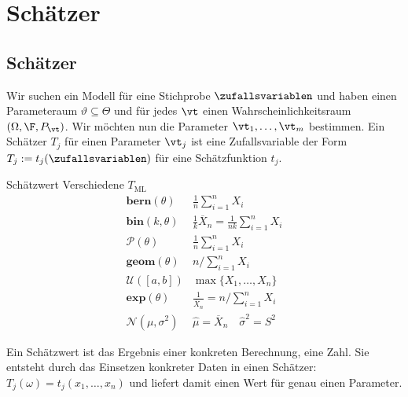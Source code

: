 
\section{Schätzer}
\subsection{Schätzer}
Wir suchen ein Modell für eine Stichprobe $\zufallsvariablen$ und haben einen
Parameteraum $\vartheta \subseteq \varTheta$ und für jedes $\vt$ einen
Wahrscheinlichkeitsraum $ (\Omega, \F, P_\vt)$. Wir möchten nun die Parameter
$\vt_1, \dots, \vt_m$ bestimmen. Ein Schätzer $T_j$ für einen Parameter $\vt_j$
ist eine Zufallsvariable der Form $T_j := t_j (\zufallsvariablen)$ für eine
Schätzfunktion $t_j$.
\begin{definition}{Schätzwert}
Verschiedene $T_{\text{ML}}$
\begin{equation*}
	\begin{array}{cc}
		\textbf{bern} (\theta) & \frac{1}{n} \sum_{i=1}^{n} X_i\\[5pt]
		\textbf{bin} (k,\theta) & \frac{1}{k} \overline{X}_n = \frac{1}{nk} \sum_{i=1}^{n} X_i\\[5pt]
		\mathcal{P} (\theta) & \frac{1}{n} \sum_{i=1}^{n} X_i\\[5pt]
		\textbf{geom}(\theta) & n / \sum_{i=1}^{n} X_i \\[10pt]
		\mathcal{U}([a,b]) & \max\{X_1, \ldots , X_n\}\\[5pt]
		\textbf{exp}(\theta) & \frac{1}{\overline{X}_n} = n / \sum_{i=1}^{n} X_i \\[5pt]
		\mathcal{N}(\mu, \sigma^2) & \hat{\mu} = \overline{X}_n \quad \hat{\sigma}^2 = S^2
	\end{array}
\end{equation*}
\end{definition}

Ein Schätzwert ist das Ergebnis einer konkreten Berechnung, eine Zahl. Sie
entsteht durch das Einsetzen konkreter Daten in einen Schätzer: $T_j (\omega) =
  t_j (x_1, \dots, x_n)$ und liefert damit einen Wert für genau einen Parameter.
